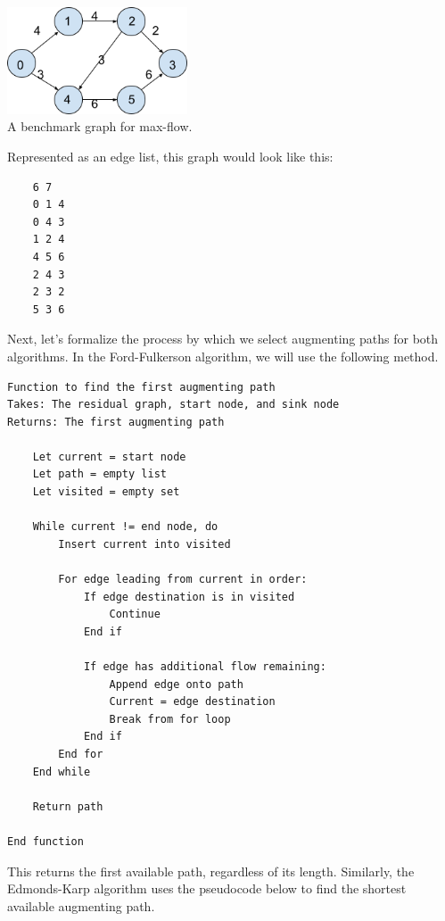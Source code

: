 \documentclass[12pt]{amsart}
\begin{document}
\begin{center}
    \includegraphics[width=0.4\textwidth]{graph} \\
    A benchmark graph for max-flow. \\
    \vskip 1cm
\end{center}

    Represented as an edge list, this graph would look like
    this:

\begin{verbatim}
    6 7
    0 1 4
    0 4 3
    1 2 4
    4 5 6
    2 4 3
    2 3 2
    5 3 6
\end{verbatim}

    Next, let's formalize the process by which we select
    augmenting paths for both algorithms. In the Ford-Fulkerson
    algorithm, we will use the following method.

\begin{verbatim}
Function to find the first augmenting path
Takes: The residual graph, start node, and sink node
Returns: The first augmenting path

    Let current = start node
    Let path = empty list
    Let visited = empty set

    While current != end node, do
        Insert current into visited

        For edge leading from current in order:
            If edge destination is in visited
                Continue
            End if

            If edge has additional flow remaining:
                Append edge onto path
                Current = edge destination
                Break from for loop
            End if
        End for
    End while

    Return path

End function

\end{verbatim}

    This returns the first available path, regardless of its
    length. Similarly, the Edmonds-Karp algorithm uses the
    pseudocode below to find the shortest available augmenting
    path.
\end{document}
